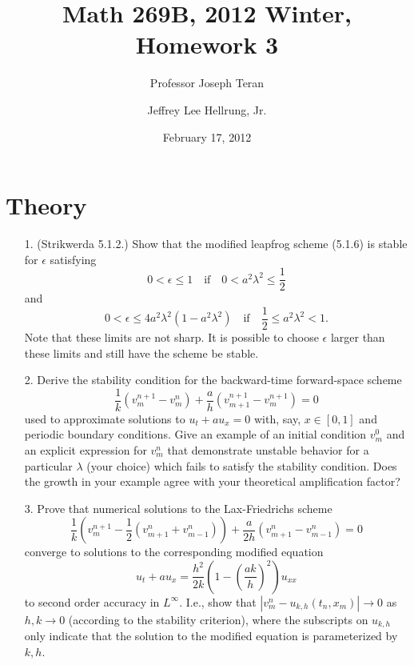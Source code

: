 \documentclass{article}
\providecommand{\abs}[1]{\left\lvert#1\right\rvert}
\begin{document}
\title{Math 269B, 2012 Winter, Homework 3}
\date{February 17, 2012}
\author{Professor Joseph Teran \and Jeffrey Lee Hellrung, Jr.}
\maketitle

\section{Theory}

\begin{itemize}

\item[1.] (Strikwerda 5.1.2.) Show that the modified leapfrog scheme (5.1.6) is stable for $\epsilon$ satisfying
\begin{equation*}
0 < \epsilon \leq 1 \quad \text{if} \quad 0 < a^2 \lambda^2 \leq \frac{1}{2}
\end{equation*}
and
\begin{equation*}
0 < \epsilon \leq 4 a^2 \lambda^2 \left( 1 - a^2 \lambda^2 \right) \quad \text{if} \quad \frac{1}{2} \leq a^2 \lambda^2 < 1.
\end{equation*}
Note that these limits are not sharp. It is possible to choose $\epsilon$ larger than these limits and still have the scheme be stable.

\item[2.] Derive the stability condition for the backward-time forward-space scheme
\begin{equation*}
\frac{1}{k} \left( v^{n+1}_m - v^n_m \right) + \frac{a}{h} \left( v^{n+1}_{m+1} - v^{n+1}_m \right) = 0
\end{equation*}
used to approximate solutions to $u_t + a u_x = 0$ with, say, $x \in [0,1]$ and periodic boundary conditions. Give an example of an initial condition $v^0_m$ and an explicit expression for $v^n_m$ that demonstrate unstable behavior for a particular $\lambda$ (your choice) which fails to satisfy the stability condition. Does the growth in your example agree with your theoretical amplification factor?

\item[3.] Prove that numerical solutions to the Lax-Friedrichs scheme
\begin{equation*}
\frac{1}{k} \left( v^{n+1}_m - \frac{1}{2} \left( v^n_{m+1} + v^n_{m-1} \right) \right) + \frac{a}{2h} \left( v^n_{m+1} - v^n_{m-1} \right) = 0
\end{equation*}
converge to solutions to the corresponding modified equation
\begin{equation*}
u_t + a u_x = \frac{h^2}{2k} \left( 1 - \left( \frac{a k}{h} \right)^2 \right) u_{xx}
\end{equation*}
to second order accuracy in $L^{\infty}$. I.e., show that $\abs{v^n_m - u_{k,h} \left( t_n,x_m \right)} \to 0$ as $h,k \to 0$ (according to the stability criterion), where the subscripts on $u_{k,h}$ only indicate that the solution to the modified equation is parameterized by $k,h$.


\end{itemize}
\end{document}
